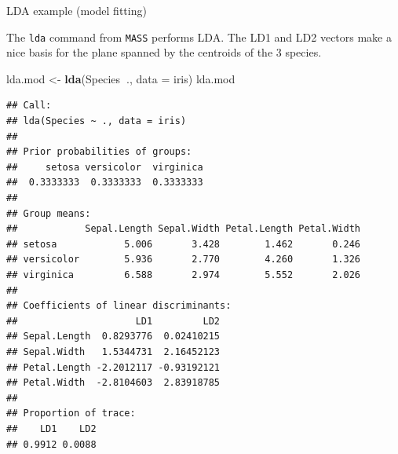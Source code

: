 \documentclass[
  ignorenonframetext,
]{beamer}
\newenvironment{Shaded}{\begin{snugshade}}{\end{snugshade}}
\newcommand{\DataTypeTok}[1]{\textcolor[rgb]{0.13,0.29,0.53}{#1}}
\newcommand{\KeywordTok}[1]{\textcolor[rgb]{0.13,0.29,0.53}{\textbf{#1}}}
\newcommand{\NormalTok}[1]{#1}
\newcommand{\OperatorTok}[1]{\textcolor[rgb]{0.81,0.36,0.00}{\textbf{#1}}}
\newcommand{\StringTok}[1]{\textcolor[rgb]{0.31,0.60,0.02}{#1}}
\begin{document}
\begin{frame}[fragile]{LDA example (model fitting)}
\protect\hypertarget{lda-example-model-fitting}{}

The \texttt{lda} command from \texttt{MASS} performs LDA. The LD1 and
LD2 vectors make a nice basis for the plane spanned by the centroids of
the 3 species.

\tiny

\begin{Shaded}
\begin{Highlighting}[]
\NormalTok{lda.mod <-}\StringTok{ }\KeywordTok{lda}\NormalTok{(Species}\OperatorTok{~}\NormalTok{., }\DataTypeTok{data =}\NormalTok{ iris)}
\NormalTok{lda.mod}
\end{Highlighting}
\end{Shaded}

\begin{verbatim}
## Call:
## lda(Species ~ ., data = iris)
## 
## Prior probabilities of groups:
##     setosa versicolor  virginica 
##  0.3333333  0.3333333  0.3333333 
## 
## Group means:
##            Sepal.Length Sepal.Width Petal.Length Petal.Width
## setosa            5.006       3.428        1.462       0.246
## versicolor        5.936       2.770        4.260       1.326
## virginica         6.588       2.974        5.552       2.026
## 
## Coefficients of linear discriminants:
##                     LD1         LD2
## Sepal.Length  0.8293776  0.02410215
## Sepal.Width   1.5344731  2.16452123
## Petal.Length -2.2012117 -0.93192121
## Petal.Width  -2.8104603  2.83918785
## 
## Proportion of trace:
##    LD1    LD2 
## 0.9912 0.0088
\end{verbatim}

\end{frame}
\end{document}
